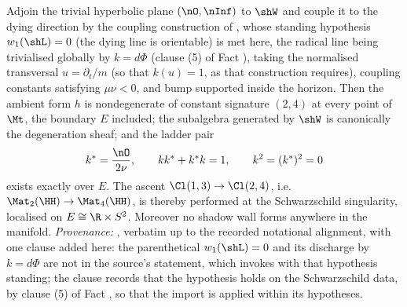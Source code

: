 Adjoin the trivial hyperbolic plane $(\nO, \nInf)$ to $\shW$ and couple it to the dying direction by the coupling construction of \cite[Def.~4.1]{ButlerT4}, whose standing hypothesis $w_1(\shL) = 0$ (the dying line is orientable) is met here, the radical line being trivialised globally by $k = d\Phi$ (clause (5) of Fact ), taking the normalised transversal $u = \partial_t/m$ (so that $k(u) = 1$, as that construction requires), coupling constants satisfying $\mu\nu < 0$, and bump supported inside the horizon. Then the ambient form $h$ is nondegenerate of constant signature $(2,4)$ at every point of $\Mt$, the boundary $E$ included; the subalgebra generated by $\shW$ is canonically the degeneration sheaf; and the ladder pair
\[
k^* = \frac{\nO}{2\nu}, \qquad k k^* + k^* k = 1, \qquad k^2 = (k^*)^2 = 0
\]
exists exactly over $E$. The ascent $\Cl(1,3) \to \Cl(2,4)$, i.e.\ $\Mat_2(\HH) \to \Mat_4(\HH)$, is thereby performed at the Schwarzschild singularity, localised on $E \cong \R \times S^2$. Moreover no shadow wall forms anywhere in the manifold.
\emph{Provenance:} \cite[Thm.~8.12]{ButlerT4}, verbatim up to the recorded notational alignment, with one clause added here: the parenthetical $w_1(\shL) = 0$ and its discharge by $k = d\Phi$ are not in the source's statement, which invokes \cite[Def.~4.1]{ButlerT4} with that hypothesis standing; the clause records that the hypothesis holds on the Schwarzschild data, by clause (5) of Fact , so that the import is applied within its hypotheses.
